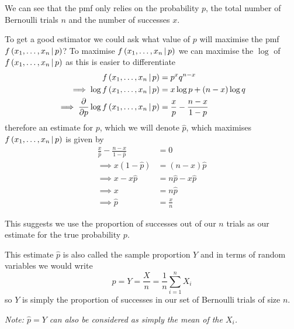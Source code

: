 \documentclass[10pt, a4paper]{article}
\begin{document}
We can see that the pmf only relies on the probability $p$,
the total number of Bernoulli trials $n$ and the number of successes $x$.

To get a good estimator we could ask what value of $p$ will maximise the pmf $f\left(x_1, \dotsc, x_n \,\middle|\, p\right)$?
To maximise $f\left(x_1, \dotsc, x_n \,\middle|\, p\right)$ we can maximise the $\log$ of $f\left(x_1, \dotsc, x_n \,\middle|\, p\right)$ as this is easier to differentiate
\begin{align*}
    f\left(x_1, \dotsc, x_n \,\middle|\, p\right) &= p ^ xq ^ {n - x} \\
    \implies \log{f\left(x_1, \dotsc, x_n \,\middle|\,p\right)} &= x\log{p} + (n - x)\log{q} \\
    \implies \frac{\partial }{\partial p}\log{f\left(x_1, \dotsc, x_n \,\middle|\,p\right)} &= \frac{x}{p} - \frac{n - x}{1 - p}
\end{align*}
therefore an estimate for $p$,
which we will denote $\hat{p}$,
which maximises $f\left(x_1, \dotsc, x_n \,\middle|\, p\right)$ is given by
\begin{align*}
    \frac{x}{\hat{p}} - \frac{n - x}{1 - \hat{p}} &= 0 \\
    \implies x(1 - \hat{p}) &= (n - x)\hat{p} \\
    \implies x - x\hat{p} &= n\hat{p} - x\hat{p} \\
    \implies x &= n\hat{p} \\
    \implies \hat{p} &= \frac{x}{n}
\end{align*}

This suggests we use the proportion of successes out of our $n$ trials as our estimate for the true probability $p$.

This estimate $\hat{p}$ is also called the sample proportion $Y$ and in terms of random variables we would write
\[
\hat{p} = Y = \frac{X}{n} = \frac{1}{n}\sum_{i = 1}^{n}X_i
\]
so $Y$ is simply the proportion of successes in our set of Bernoulli trials of size $n$.

\textit{Note:
$\hat{p} = Y$ can also be considered as simply the mean of the $X_i$.}
\end{document}
